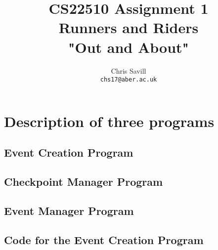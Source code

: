 \documentclass[a4paper,12pt]{article}
\title{CS22510 Assignment 1\\
Runners and Riders\\
"Out and About"}
\author{Chris Savill\\\texttt{chs17@aber.ac.uk}}
\begin{document}
\maketitle
\newpage
\tableofcontents
\newpage

\section{Description of three programs}

\subsection{Event Creation Program}

\subsection{Checkpoint Manager Program}

\subsection{Event Manager Program}

\begin{landscape}
\section{Code for the Event Creation Program}








\end{landscape}
\end{document}
